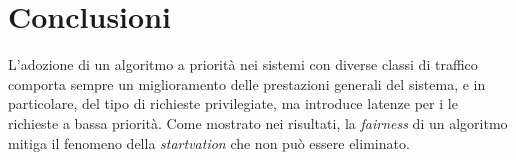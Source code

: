 \chapter*{Conclusioni}
L'adozione di un algoritmo a priorità nei sistemi con diverse classi di traffico comporta sempre un miglioramento delle prestazioni generali del sistema, e in particolare, del tipo di richieste privilegiate, ma introduce latenze per i le richieste a bassa priorità. Come mostrato nei risultati, la \textit{fairness} di un algoritmo mitiga il fenomeno della \textit{startvation} che non può essere eliminato.
